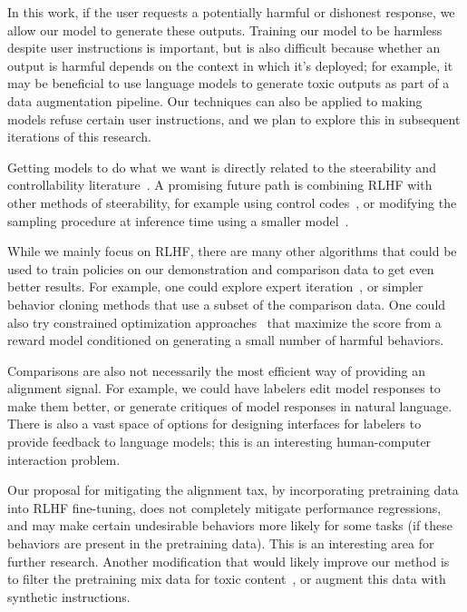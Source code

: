 In this work, if the user requests a potentially harmful or dishonest response, we allow our model to generate these outputs. Training our model to be harmless despite user instructions is important, but is also difficult because whether an output is harmful depends on the context in which it's deployed; for example, it may be beneficial to use language models to generate toxic outputs as part of a data augmentation pipeline. Our techniques can also be applied to making models refuse certain user instructions, and we plan to explore this in subsequent iterations of this research. 

Getting models to do what we want is directly related to the steerability and controllability literature~\citep{dathathri2019plug,krause2020gedi}. A promising future path is combining RLHF with other methods of steerability, for example using control codes~\citep{keskar2019ctrl}, or modifying the sampling procedure at inference time using a smaller model~\citep{dathathri2019plug}.

While we mainly focus on RLHF, there are many other algorithms that could be used to train policies on our demonstration and comparison data to get even better results. For example, one could explore expert iteration~\citep{anthony2017thinking,silver2017mastering}, or simpler behavior cloning methods that use a subset of the comparison data. One could also try constrained optimization approaches~\citep{achiam2017constrained} that maximize the score from a reward model conditioned on generating a small number of harmful behaviors.

Comparisons are also not necessarily the most efficient way of providing an alignment signal. For example, we could have labelers edit model responses to make them better, or generate critiques of model responses in natural language. There is also a vast space of options for designing interfaces for labelers to provide feedback to language models; this is an interesting human-computer interaction problem.

Our proposal for mitigating the alignment tax, by incorporating pretraining data into RLHF fine-tuning, does not completely mitigate performance regressions, and may make certain undesirable behaviors more likely for some tasks (if these behaviors are present in the pretraining data). This is an interesting area for further research. Another modification that would likely improve our method is to filter the pretraining mix data for toxic content~\citep{ngo2021mitigating}, or augment this data with synthetic instructions.

